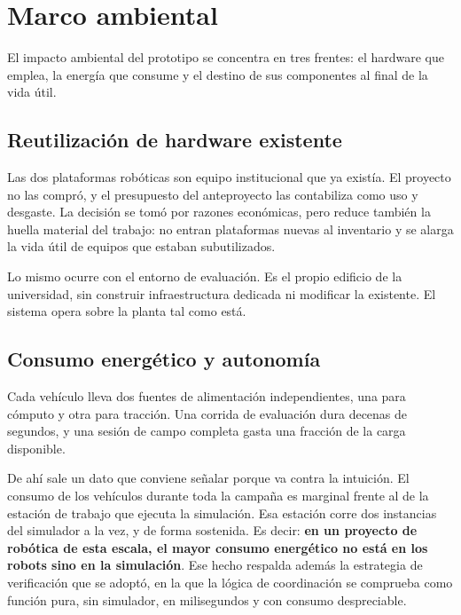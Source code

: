 \section{Marco ambiental}

El impacto ambiental del prototipo se concentra en tres frentes: el hardware que
emplea, la energía que consume y el destino de sus componentes al final de la
vida útil.

\subsection{Reutilización de hardware existente}

Las dos plataformas robóticas son equipo institucional que ya existía. El
proyecto no las compró, y el presupuesto del anteproyecto las contabiliza como
uso y desgaste. La decisión se tomó por razones económicas, pero reduce también
la huella material del trabajo: no entran plataformas nuevas al inventario y se
alarga la vida útil de equipos que estaban subutilizados.

Lo mismo ocurre con el entorno de evaluación. Es el propio edificio de la
universidad, sin construir infraestructura dedicada ni modificar la existente. El
sistema opera sobre la planta tal como está.

\subsection{Consumo energético y autonomía}

Cada vehículo lleva dos fuentes de alimentación independientes, una para cómputo
y otra para tracción. Una corrida de evaluación dura decenas de segundos, y una
sesión de campo completa gasta una fracción de la carga disponible.

De ahí sale un dato que conviene señalar porque va contra la intuición. El
consumo de los vehículos durante toda la campaña es marginal frente al de la
estación de trabajo que ejecuta la simulación. Esa estación corre dos instancias
del simulador a la vez, y de forma sostenida. Es decir: \textbf{en un proyecto de
robótica de esta escala, el mayor consumo energético no está en los robots sino
en la simulación}. Ese hecho respalda además la estrategia de verificación que se
adoptó, en la que la lógica de coordinación se comprueba como función pura, sin
simulador, en milisegundos y con consumo despreciable.

